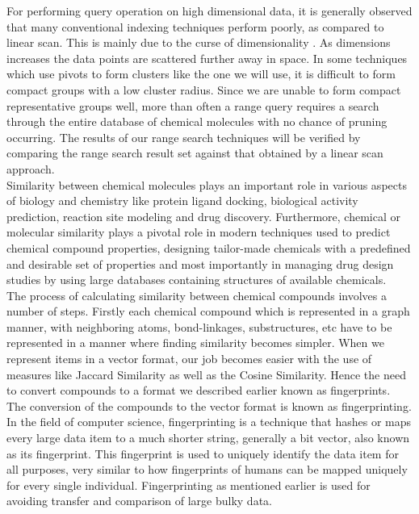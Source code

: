 For performing query operation on high dimensional data, it is generally observed that many conventional indexing techniques perform poorly, as compared to linear scan. This is mainly due to the curse of dimensionality . As dimensions increases the data points are scattered further away in space. In some techniques which use pivots to form clusters like the one we will use, it is difficult to form compact groups with a low cluster radius. Since we are unable to form compact representative groups well, more than often a range query requires a search through the entire database of chemical molecules with no chance of pruning occurring.  The results of our range search techniques will be verified by comparing the range search result set against that obtained by a linear scan approach.\\

Similarity between chemical molecules plays an important role in various aspects of biology and chemistry like protein ligand docking, biological activity prediction, reaction site modeling and drug discovery. Furthermore, chemical or molecular similarity  plays a pivotal role in modern techniques used to predict chemical compound properties, designing tailor-made chemicals with a predefined and desirable set of properties and most importantly in managing drug design studies by using large databases containing structures of available chemicals.\\

The process of calculating similarity between chemical compounds involves a number of steps. Firstly each chemical compound which is represented in a graph manner, with neighboring atoms, bond-linkages, substructures, etc have to be represented in a manner where finding similarity becomes simpler. When we represent items in a vector format, our job becomes easier with the use of measures like Jaccard Similarity as well as the Cosine Similarity. Hence the need to convert compounds to a format we described earlier known as fingerprints. \\

The conversion of the compounds to the vector format is known as fingerprinting. In the field of computer science, fingerprinting is a technique that hashes or maps every large data item to a much shorter string, generally a bit vector, also known as its fingerprint. This fingerprint is used to uniquely identify the data item for all purposes, very similar to how fingerprints of humans can be mapped uniquely for every single individual. Fingerprinting as mentioned earlier is used for avoiding transfer and comparison of large bulky data. \\

